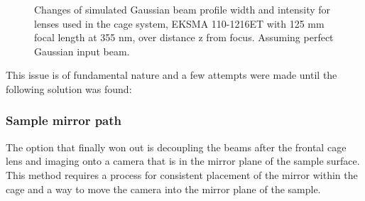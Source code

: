 \documentclass[twoside,openright]{scrreprt}
\begin{document}
\begin{figure}[h]
\begin{subfigure}[t]{\textwidth}
\end{subfigure}
\caption{Changes of simulated Gaussian beam profile width and intensity for lenses used in the cage system, EKSMA 110-1216ET with 125 mm focal length at 355 nm, over distance z from focus. Assuming perfect Gaussian input beam. \label{fig:beamWaistCompendium}}
\end{figure}

This issue is of fundamental nature and a few attempts were made until the following solution was found:

\subsubsection{Sample mirror path}\label{SampleMirrorCamera}
The option that finally won out is decoupling the beams after the frontal cage lens and imaging onto a camera that is in the mirror plane of the sample surface. This method requires a process for consistent placement of the mirror within the cage and a way to move the camera into the mirror plane of the sample.\\
\end{document}
